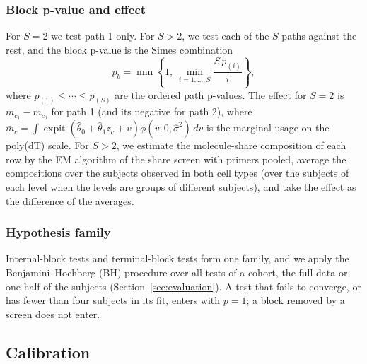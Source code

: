 \documentclass[11pt]{article}
\newcommand{\expit}{\operatorname{expit}}
\begin{document}
\subsubsection{Block p-value and effect}

For $S=2$ we test path 1 only. For $S>2$, we test each of the $S$ paths against the rest, and the block p-value is the Simes combination \cite{simes1986} \[p_b=\min\left\{1,\ \min_{i=1,\ldots,S}\frac{S\,p_{(i)}}{i}\right\},\] where $p_{(1)}\le\cdots\le p_{(S)}$ are the ordered path p-values. The effect for $S=2$ is $\bar m_{c_1}-\bar m_{c_0}$ for path 1 (and its negative for path 2), where $\bar m_c=\int\expit(\widehat\theta_0+\widehat\theta_1z_c+v)\phi(v;0,\widehat\sigma^2)\,dv$ is the marginal usage on the poly(dT) scale. For $S>2$, we estimate the molecule-share composition of each row by the EM algorithm of the share screen with primers pooled, average the compositions over the subjects observed in both cell types (over the subjects of each level when the levels are groups of different subjects), and take the effect as the difference of the averages.

\subsubsection{Hypothesis family}

Internal-block tests and terminal-block tests form one family, and we apply the Benjamini--Hochberg (BH) procedure \cite{benjamini1995} over all tests of a cohort, the full data or one half of the subjects (Section~\ref{sec:evaluation}). A test that fails to converge, or has fewer than four subjects in its fit, enters with $p=1$; a block removed by a screen does not enter.

\subsection{Calibration}
\label{sec:calibration}
\end{document}
